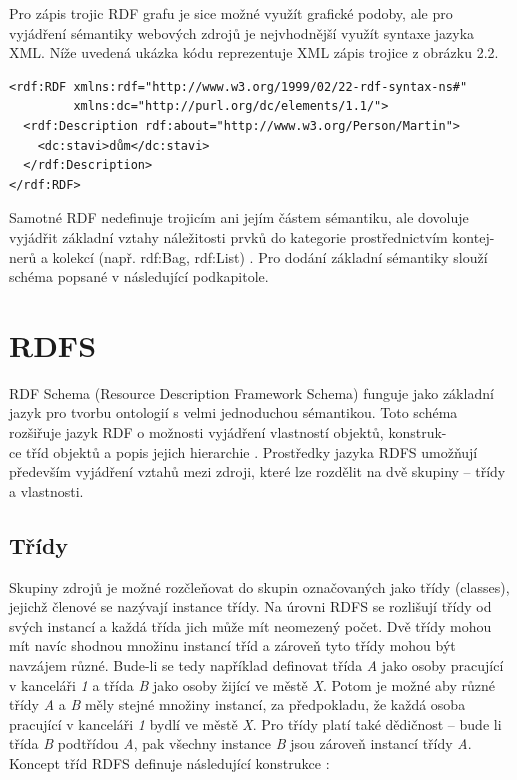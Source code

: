 \documentclass{projekt}
\begin{document}
Pro zápis trojic RDF grafu je sice možné využít grafické podoby, ale pro vyjádření sémantiky webových zdrojů je nejvhodnější využít syntaxe jazyka XML. Níže uvedená ukázka kódu reprezentuje XML zápis trojice z obrázku 2.2.

\begin{verbatim}
<rdf:RDF xmlns:rdf="http://www.w3.org/1999/02/22-rdf-syntax-ns#"
         xmlns:dc="http://purl.org/dc/elements/1.1/">
  <rdf:Description rdf:about="http://www.w3.org/Person/Martin">
    <dc:stavi>dům</dc:stavi>
  </rdf:Description>
</rdf:RDF>

\end{verbatim}

Samotné RDF nedefinuje trojicím ani jejím částem sémantiku, ale dovoluje vyjádřit základní vztahy náležitosti prvků do kategorie prostřednictvím kontej-\\nerů a kolekcí (např. rdf:Bag, rdf:List) \cite{_2}. Pro dodání základní sémantiky slouží schéma popsané v následující podkapitole.

\section{RDFS}
\hspace{0.65cm}RDF Schema (Resource Description Framework Schema) funguje jako základní jazyk pro tvorbu ontologií s velmi jednoduchou sémantikou. Toto schéma rozšiřuje jazyk RDF o možnosti vyjádření vlastností objektů, konstruk-\\ce tříd objektů a popis jejich hierarchie \cite{_2}. 
Prostředky jazyka RDFS umožňují především vyjádření vztahů mezi zdroji, které lze rozdělit na dvě skupiny – třídy a vlastnosti.

\subsection{Třídy}
\hspace{0.65cm}Skupiny zdrojů je možné rozčleňovat do skupin označovaných jako třídy (classes), jejichž členové se nazývají instance třídy. Na úrovni RDFS se rozlišují třídy od svých instancí a každá třída jich může mít neomezený počet. Dvě třídy mohou mít navíc shodnou množinu instancí tříd a zároveň tyto třídy mohou být navzájem různé. Bude-li se tedy například definovat třída {\it A} jako osoby pracující v kanceláři {\it 1} a třída {\it B} jako osoby žijící ve městě {\it X}. Potom je možné aby různé třídy {\it A} a {\it B} měly stejné množiny instancí, za předpokladu, že každá osoba pracující v kanceláři {\it 1} bydlí ve městě {\it X}. Pro třídy platí také dědičnost – bude li třída {\it B} podtřídou {\it A}, pak všechny instance {\it B} jsou zároveň instancí třídy {\it A}. Koncept tříd RDFS definuje následující konstrukce \cite{_7}:
\end{document}
